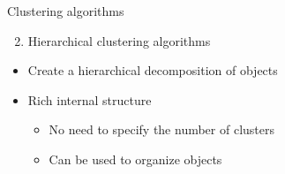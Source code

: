 \documentclass[
  ignorenonframetext,
]{beamer}
\providecommand{\tightlist}{%
  \setlength{\itemsep}{0pt}\setlength{\parskip}{0pt}}
\begin{document}
\begin{frame}{Clustering algorithms}
\protect\hypertarget{clustering-algorithms-2}{}
\begin{enumerate}
\setcounter{enumi}{1}
\tightlist
\item
  Hierarchical clustering algorithms
\end{enumerate}

\begin{itemize}
\item
  Create a hierarchical decomposition of objects
\item
  Rich internal structure

  \begin{itemize}
  \item
    No need to specify the number of clusters
  \item
    Can be used to organize objects
  \end{itemize}
\end{itemize}
\end{frame}
\end{document}
